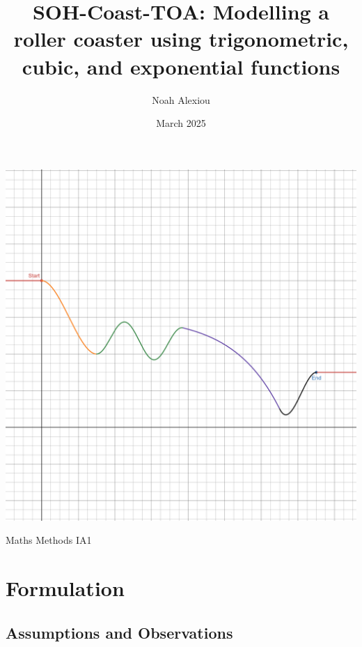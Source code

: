 \documentclass[11pt, letterpaper]{article}
\begin{document}
\begin{titlepage}
	\title{SOH-Coast-TOA: Modelling a roller coaster using trigonometric, cubic, and exponential functions}
	
	\author{Noah Alexiou}


	\date{March 2025}
	
	\maketitle
	\centering
	\includegraphics[width=1\linewidth]{finalgraph.png}
\begin{center}
	\large
	\vfill
	Maths Methods IA1
\end{center}
	
\end{titlepage}


\newpage
\tableofcontents


\newpage


\section{Formulation}
\subsection{Assumptions and Observations}
\end{document}
